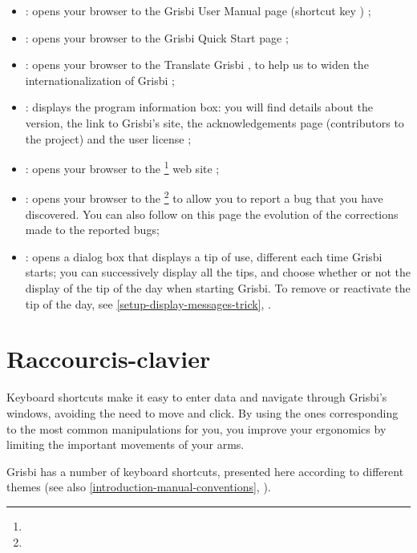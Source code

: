 \begin{itemize}
	\item {} : opens your browser to the \og Grisbi User Manual page \fg{} (shortcut key  ) ;
	\item {} : opens your browser to the \og Grisbi Quick Start page \fg{} ;
	\item {} : opens your browser to the \og Translate Grisbi \fg{}, to help us to widen the internationalization of Grisbi ;
	\item {} : displays the program information box: you will find details about the version, the link to Grisbi's site, the acknowledgements page (contributors to the project) and the user license ;
	\item {} : opens your browser to the \footnote{\urlGrisbi{}} web site ;
	\item {} : opens your browser to the \footnote{\urlBugTracker{}} to allow you to report a bug that you have discovered. You can also follow on this page the evolution of the corrections made to the reported bugs;
	\item {} : opens a dialog box that displays a tip of use, different each time Grisbi starts; you can successively display all the tips, and choose whether or not the display of the tip of the day when starting Grisbi. To remove or reactivate the tip of the day, see \vref{setup-display-messages-trick}, .
\end{itemize}


\section{Raccourcis-clavier\label{home-shortcuts}}


Keyboard shortcuts make it easy to enter data and navigate through Grisbi's windows, avoiding the need to move and click. By using the ones corresponding to the most common manipulations for you, you improve your ergonomics  by limiting the important movements of your arms.
 
Grisbi has a number of keyboard shortcuts, presented here according to different themes (see also  \vref{introduction-manual-conventions}, ).

